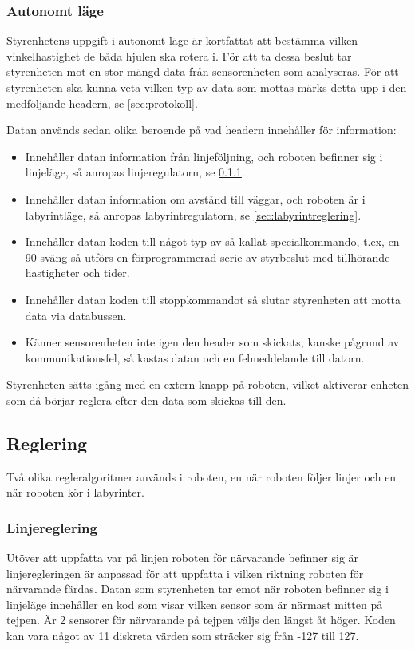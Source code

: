 \subsubsection{Autonomt läge}

Styrenhetens uppgift i autonomt läge är kortfattat att bestämma vilken vinkelhastighet de båda hjulen ska rotera i. 
För att ta dessa beslut tar styrenheten mot en stor mängd data från sensorenheten som analyseras.
För att styrenheten ska kunna veta vilken typ av data som mottas märks detta upp i den
medföljande headern, se \ref{sec:protokoll}. 

Datan används sedan olika beroende på vad headern innehåller för information:
 
 \begin{itemize}
 
\item Innehåller datan information från linjeföljning, och roboten befinner sig i linjeläge, 
så anropas linjeregulatorn, se \ref{sec:linjereglering}.

\item Innehåller datan information om avstånd till väggar, och roboten är i labyrintläge,
 så anropas labyrintregulatorn, se \ref{sec:labyrintreglering}.

\item Innehåller datan koden till något typ av så kallat specialkommando, t.ex, en 90\degree 
sväng så utförs en förprogrammerad serie av styrbeslut med tillhörande hastigheter och tider.

\item Innehåller datan koden till stoppkommandot så slutar styrenheten att motta data via databussen.

\item Känner sensorenheten inte igen den header som skickats, kanske pågrund av kommunikationsfel,
så kastas datan och en felmeddelande till datorn.

\end{itemize}

Styrenheten sätts igång med en extern knapp på roboten, vilket aktiverar enheten som då börjar
reglera efter den data som skickas till den.

\subsection{Reglering}
Två olika regleralgoritmer används i roboten, en när roboten följer linjer och
en när roboten kör i labyrinter.
\subsubsection{Linjereglering}
\label{sec:linjereglering}
Utöver att uppfatta var på linjen roboten för närvarande befinner sig är 
linjeregleringen är anpassad för att uppfatta i vilken riktning roboten för 
närvarande färdas. Datan som styrenheten tar emot när roboten befinner sig i 
linjeläge innehåller en kod som visar vilken sensor som är närmast mitten på 
tejpen. Är 2 sensorer för närvarande på tejpen väljs den längst åt höger. 
Koden kan vara något av 11 diskreta värden som sträcker sig från -127 till 127.

